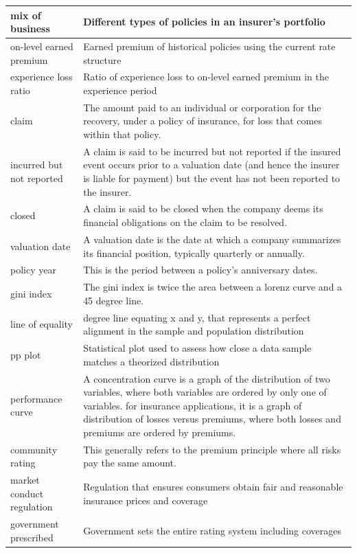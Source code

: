 \documentclass[
]{book}
\begin{document}
\begin{longtable}{>{\raggedright\arraybackslash}p{10em}|>{\raggedright\arraybackslash}p{30em}}
\hline
mix of business & Different types of policies in an insurer's portfolio\\
\hline
on-level earned premium & Earned premium of historical policies using the current rate structure\\
\hline
experience loss ratio & Ratio of experience loss to on-level earned premium in the experience period\\
\hline
claim & The amount paid to an individual or corporation for the recovery, under a policy of insurance, for loss that comes within that policy.\\
\hline
incurred but not reported & A claim is said to be incurred but not reported if the insured event occurs prior to a valuation date (and hence the insurer is liable for payment) but the event has not been reported to the insurer.\\
\hline
closed & A claim is said to be closed when the company deems its financial obligations on the claim to be resolved.\\
\hline
valuation date & A valuation date is the date at which a company summarizes its financial position, typically quarterly or annually.\\
\hline
policy year & This is the period between a policy's anniversary dates.\\
\hline
gini index & The gini index is twice the area between a lorenz curve and a 45 degree line.\\
\hline
line of equality & 45 degree line equating x and y, that represents a perfect alignment in the sample and population distribution\\
\hline
pp plot & Statistical plot used to assess how close a data sample matches a theorized distribution\\
\hline
performance curve & A concentration curve is a graph of the distribution of two variables, where both variables are ordered by only one of variables. for insurance applications, it is a graph of distribution of losses versus premiums, where both losses and premiums are ordered by premiums.\\
\hline
community rating & This generally refers to the premium principle where all risks pay the same amount.\\
\hline
market conduct regulation & Regulation that ensures consumers obtain fair and reasonable insurance prices and coverage\\
\hline
government prescribed & Government sets the entire rating system including coverages\\

\end{longtable}
\end{document}

